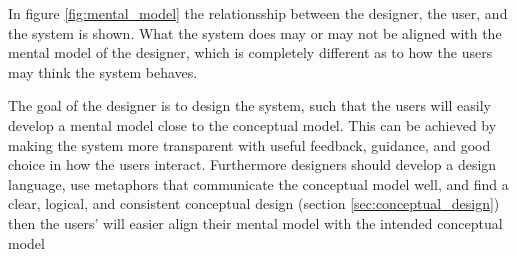 

In figure \ref{fig:mental_model} the relationsship between the designer, the user, and the system is shown. What the system does may or may not be aligned with the mental model of the designer, which is completely different as to how the users may think the system behaves. \cite[p. 31]{benyon14} 



The goal of the designer is to design the system, such that the users will easily develop a mental model close to the conceptual model. This can be achieved by making the system more transparent with useful feedback, guidance, and good choice in how the users interact. Furthermore designers should develop a design language, use metaphors that communicate the conceptual model well, and find a clear, logical, and consistent conceptual design (section \ref{sec:conceptual_design}) then the users' will easier align their mental model with the intended conceptual model \cite[p. 86-88]{rogers} \cite[p. 32]{benyon14}
